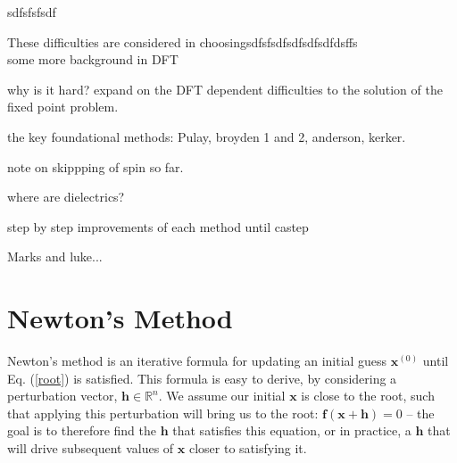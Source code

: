 sdfsfsfsdf

These difficulties are considered in choosingsdfsfsdfsdfsdfsdfdsffs  \\




some more background in DFT

why is it hard? expand on the DFT dependent difficulties to the solution of the fixed point problem. 

the key foundational methods: Pulay, broyden 1 and 2, anderson, kerker. 

note on skippping of spin so far. 

where are dielectrics? 

step by step improvements of each method until castep

Marks and luke...





\section{Newton's Method}

Newton's method is an iterative formula for updating an initial guess $\textbf{x}^{(0)}$ until Eq$.$ (\ref{root}) is satisfied. This formula is easy to derive, by considering a perturbation vector, $\textbf{h} \in \mathbb{R}^n$. We assume our initial $\textbf{x}$ is close to the root, such that applying this perturbation will bring us to the root: $\textbf{f}({\textbf{x} + \textbf{h}}) = 0$ -- the goal is to therefore find the $\textbf{h}$ that satisfies this equation, or in practice, a $\textbf{h}$ that will drive subsequent values of $\textbf{x}$ closer to satisfying it. 

